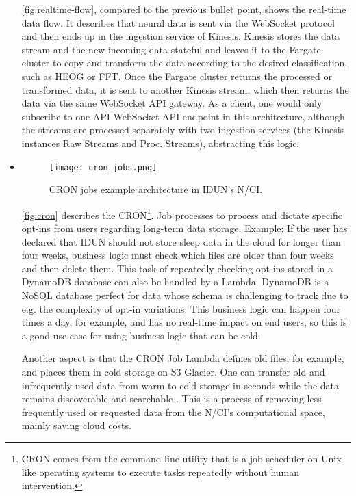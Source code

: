 \begin{itemize}
        \autoref{fig:realtime-flow}, compared to the previous bullet point, shows the real-time data flow. It describes that neural data is sent via the WebSocket protocol and then ends up in the ingestion service of Kinesis. Kinesis stores the data stream and the new incoming data stateful and leaves it to the Fargate cluster to copy and transform the data according to the desired classification, such as HEOG or FFT. Once the Fargate cluster returns the processed or transformed data, it is sent to another Kinesis stream, which then returns the data via the same WebSocket API gateway. As a client, one would only subscribe to one API WebSocket API endpoint in this architecture, although the streams are processed separately with two ingestion services (the Kinesis instances Raw Streams and Proc. Streams), abstracting this logic.

  \item \begin{figure}[!ht]
          \centering
          \hspace*{0.4in}
          \texttt{[image: cron-jobs.png]}
          \caption{CRON jobs example architecture in IDUN's N/CI.}
          \label{fig:cron}
        \end{figure}

        \autoref{fig:cron} describes the CRON\footnote{CRON comes from the command line utility that is a job scheduler on Unix-like operating systems to execute tasks repeatedly without human intervention.}. Job processes to process and dictate specific opt-ins from users regarding long-term data storage. Example: If the user has declared that IDUN should not store sleep data in the cloud for longer than four weeks, business logic must check which files are older than four weeks and then delete them. This task of repeatedly checking opt-ins stored in a DynamoDB database can also be handled by a Lambda. DynamoDB is a NoSQL database perfect for data whose schema is challenging to track due to e.g. the complexity of opt-in variations. This business logic can happen four times a day, for example, and has no real-time impact on end users, so this is a good use case for using business logic that can be cold.

        Another aspect is that the CRON Job Lambda defines old files, for example, and places them in cold storage on S3 Glacier. One can transfer old and infrequently used data from warm to cold storage in seconds while the data remains discoverable and searchable \citep{sayed_introducing_2021}. This is a process of removing less frequently used or requested data from the N/CI's computational space, mainly saving cloud costs.


\end{itemize}
